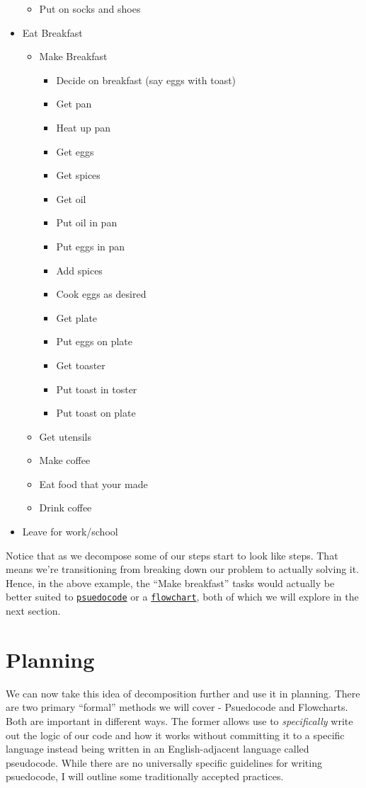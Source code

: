 \documentclass[12pt,a4paper]{book}
\begin{document}
\begin{itemize}
\begin{itemize}
						\item Put on socks and shoes
					\end{itemize}	
				\item Eat Breakfast
					\begin{itemize}
						\item Make Breakfast
							\begin{itemize}
								\item Decide on breakfast (say eggs with toast)
								\item Get pan
								\item Heat up pan
								\item Get eggs
								\item Get spices
								\item Get oil
								\item Put oil in pan
								\item Put eggs in pan
								\item Add spices
								\item Cook eggs as desired
								\item Get plate
								\item Put eggs on plate
								\item Get toaster
								\item Put toast in toster
								\item Put toast on plate
							\end{itemize}
						\item Get utensils
						\item Make coffee
						\item Eat food that your made
						\item Drink coffee
					\end{itemize}
				\item Leave for work/school
			\end{itemize}

			Notice that as we decompose some of our steps start to look like steps. That means we're transitioning from breaking down our problem to actually solving it. Hence, in the above example, the ``Make breakfast'' tasks would actually be better suited to \hyperref[sec:psuedocode]{\texttt{psuedocode}} or a \hyperref[sec:flowchart]{\texttt{flowchart}}, both of which we will explore in the next section.

		\section{Planning}
			We can now take this idea of decomposition further and use it in planning. There are two primary ``formal'' methods we will cover - Psuedocode and Flowcharts. Both are important in different ways. The former allows use to \textit{specifically} write out the logic of our code and how it works without committing it to a specific language instead being written in an English-adjacent language called pseudocode. While there are no universally specific guidelines for writing psuedocode, I will outline some traditionally accepted practices.
			
\end{document}
